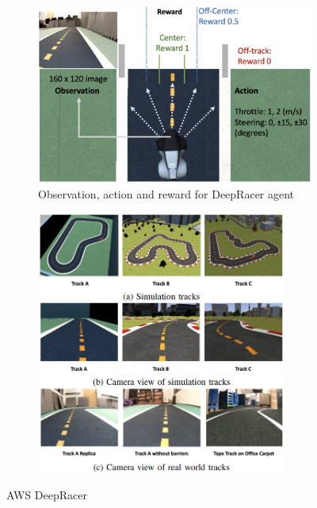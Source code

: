 \documentclass[12pt,twoside]{report}
\begin{document}
\begin{figure}[h]
     \centering
     \begin{subfigure}[b]{0.49\textwidth}
         \centering
         \includegraphics[width=\textwidth]{figures/other/deepracer-obs-act-rew.png}
         \caption{Observation, action and reward for DeepRacer agent}
     \end{subfigure}
     \hfill
     \begin{subfigure}[b]{0.49\textwidth}
         \centering
         \includegraphics[width=0.9\textwidth]{figures/other/deepracer-tracks.png}
     \end{subfigure}
        \caption{AWS DeepRacer \cite{aws-deepracer}}
        \label{fig:aws-deepracer}
\end{figure}
\end{document}
